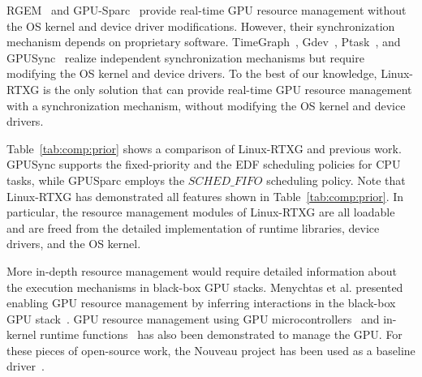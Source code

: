 \label{sec:relatedwork}
\begin{table*}[t]
\begin{center}
\caption{Linux-RTXG vs Prior Work}
\label{tab:comp:prior}
\ifthesis
{}
\fi
\end{center}
\vspace{-4mm}
\end{table*}

RGEM~\cite{kato:rgem} and GPU-Sparc~\cite{sparc} provide real-time GPU resource management without the OS kernel and device driver modifications.
However, their synchronization mechanism depends on proprietary software.
TimeGraph~\cite{kato:timegraph}, Gdev~\cite{kato:gdev}, Ptask~\cite{ptask}, and GPUSync~\cite{elliott:gpusync13} realize independent synchronization mechanisms but require modifying the OS kernel and device drivers.
To the best of our knowledge, Linux-RTXG is the only solution that can provide real-time GPU resource management with a synchronization mechanism, without modifying the OS kernel and device drivers.

Table~\ref{tab:comp:prior} shows a comparison of Linux-RTXG and previous work.
GPUSync supports the fixed-priority and the EDF scheduling policies for CPU tasks, while GPUSparc employs the $SCHED\_FIFO$ scheduling policy.
Note that Linux-RTXG has demonstrated all features shown in Table~\ref{tab:comp:prior}.
In particular, the resource management modules of Linux-RTXG are all loadable and are freed from the detailed implementation of runtime libraries, device drivers, and the OS kernel.

More in-depth resource management would require detailed information about the execution mechanisms in black-box GPU stacks.
Menychtas et al. presented enabling GPU resource management by inferring interactions in the black-box GPU stack~\cite{menychtas2013enabling}. 
GPU resource management using GPU microcontrollers~\cite{fujii:apsys2013} and in-kernel runtime functions~\cite{kato:gdev} has also been demonstrated to manage the GPU.
For these pieces of open-source work, the Nouveau project has been used as a baseline driver~\cite{nouveau}.
